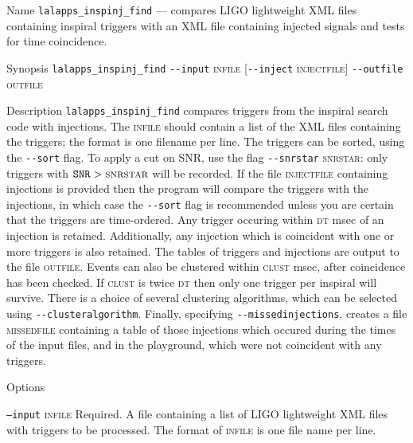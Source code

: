 \begin{entry}
\item[Name]
\verb$lalapps_inspinj_find$ --- compares LIGO lightweight XML files 
containing inspiral triggers with an XML file containing injected
signals and tests for time coincidence.


\item[Synopsis]
\verb$lalapps_inspinj_find$ 
\verb$--input$ \textsc{infile} [\verb$--inject$ \textsc{injectfile}]
\verb$--outfile$ \textsc{outfile}  
 


\item[Description] 
\verb$lalapps_inspinj_find$ compares triggers from the inspiral
search code with injections.  The \textsc{infile} should contain a
list of the XML files containing the triggers; the format is one
filename per line.  The triggers can be sorted, using the
\verb$--sort$ flag.  To apply a cut on SNR,  use the flag  
\verb$--snrstar$ \textsc{snrstar}:  only triggers with $\texttt{SNR} 
> \textsc{snrstar}$ will be recorded.  If the file \textsc{injectfile}
containing injections is provided then the program will compare the
triggers with the injections, in which case the \verb$--sort$ flag is
recommended unless you are certain that the triggers are time-ordered.
Any trigger occuring within \textsc{dt} msec of an injection
is retained.  Additionally, any injection which is coincident with one
or more triggers is also retained.  The tables of triggers and
injections are output to the file \textsc{outfile}.  Events can also
be clustered within \textsc{clust} msec, after coincidence has
been checked.  If \textsc{clust} is twice \textsc{dt}
then only one trigger per inspiral will survive.  There is a choice of
several clustering algorithms, which can be selected using
\verb$--clusteralgorithm$.  Finally, specifying \verb$--missedinjections$,
creates a file \textsc{missedfile} containing a table of those
injections which occured during the times of the input files, and in
the playground, which were not coincident with any triggers.


\item[Options]\leavevmode
\begin{entry}
\item[\texttt{--input} \textsc{infile}] Required.  A file containing a
list of LIGO lightweight XML files with triggers to be processed.  The
format of \textsc{infile} is one file name per line.


\end{entry}
\end{entry}
